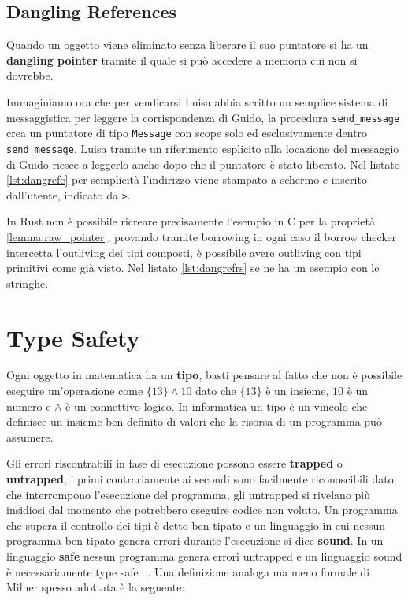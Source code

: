 \documentclass[Lau,binding=0.6cm]{sapthesis}
\newcommand{\textcode}[1]{\colorbox{backcolour}{\texttt{#1}}}
\begin{document}
\section{Dangling References} \label{sec:dangling_reference}
Quando un oggetto viene eliminato senza liberare il suo puntatore si ha un \textbf{dangling pointer} tramite il quale si può accedere a memoria cui non si dovrebbe.

Immaginiamo ora che per vendicarsi Luisa abbia scritto un semplice sistema di messaggistica per leggere la corrispondenza di Guido, la procedura \textcode{send\_message} crea un puntatore di tipo \textcode{Message} con scope solo ed esclusivamente dentro \textcode{send\_message}. 
Luisa tramite un riferimento esplicito alla locazione del messaggio di Guido riesce a leggerlo anche dopo che il puntatore è stato liberato.
Nel listato \ref{lst:dangrefc} per semplicità l'indirizzo viene stampato a schermo e inserito dall'utente, indicato da \textcode{>}.




In Rust non è possibile ricreare precisamente l'esempio in C per la proprietà \ref{lemma:raw_pointer}, provando tramite borrowing in ogni caso il borrow checker intercetta l'outliving dei tipi composti, è possibile avere outliving con tipi primitivi come già visto. 
Nel listato \ref{lst:dangrefrs} se ne ha un esempio con le stringhe.



\chapter{Type Safety} \label{chap:type_safety}
Ogni oggetto in matematica ha un \textbf{tipo}, basti pensare al fatto che non è possibile eseguire un'operazione come $ \{13\} \land 10 $ dato che $\{13\}$ è un insieme, $10$ è un numero e $\land$ è un connettivo logico. 
In informatica un tipo è un vincolo che definisce un insieme ben definito di valori che la risorsa di un programma può assumere.

Gli errori riscontrabili in fase di esecuzione possono essere \textbf{trapped} o \textbf{untrapped}, i primi contrariamente ai secondi sono facilmente riconoscibili dato che interrompono l'esecuzione del programma, gli untrapped si rivelano più insidiosi dal momento che potrebbero eseguire codice non voluto.
Un programma che supera il controllo dei tipi è detto ben tipato e un linguaggio in cui nessun programma ben tipato genera errori durante l'esecuzione si dice \textbf{sound}.
In un linguaggio \textbf{safe} nessun programma genera errori untrapped e un linguaggio sound è necessariamente type safe ~\cite{cencia:dispense}.
Una definizione analoga ma meno formale di Milner spesso adottata è la seguente:
\end{document}
